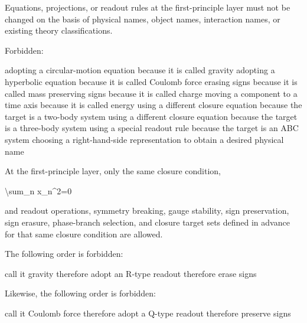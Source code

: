 \documentclass[
  a4paper]{article}
\newenvironment{Shaded}{}{}
\newcommand{\NormalTok}[1]{#1}
\begin{document}
Equations, projections, or readout rules at the first-principle layer
must not be changed on the basis of physical names, object names,
interaction names, or existing theory classifications.

Forbidden:

\begin{Shaded}
\begin{Highlighting}[]
\NormalTok{adopting a circular{-}motion equation because it is called gravity}
\NormalTok{adopting a hyperbolic equation because it is called Coulomb force}
\NormalTok{erasing signs because it is called mass}
\NormalTok{preserving signs because it is called charge}
\NormalTok{moving a component to a time axis because it is called energy}
\NormalTok{using a different closure equation because the target is a two{-}body system}
\NormalTok{using a different closure equation because the target is a three{-}body system}
\NormalTok{using a special readout rule because the target is an ABC system}
\NormalTok{choosing a right{-}hand{-}side representation to obtain a desired physical name}
\end{Highlighting}
\end{Shaded}

At the first-principle layer, only the same closure condition,

\begin{Shaded}
\begin{Highlighting}[]
\NormalTok{\textbackslash{}sum\_n x\_n\^{}2=0}
\end{Highlighting}
\end{Shaded}

and readout operations, symmetry breaking, gauge stability, sign
preservation, sign erasure, phase-branch selection, and closure target
sets defined in advance for that same closure condition are allowed.

The following order is forbidden:

\begin{Shaded}
\begin{Highlighting}[]
\NormalTok{call it gravity}
\NormalTok{therefore adopt an R{-}type readout}
\NormalTok{therefore erase signs}
\end{Highlighting}
\end{Shaded}

Likewise, the following order is forbidden:

\begin{Shaded}
\begin{Highlighting}[]
\NormalTok{call it Coulomb force}
\NormalTok{therefore adopt a Q{-}type readout}
\NormalTok{therefore preserve signs}
\end{Highlighting}
\end{Shaded}
\end{document}
